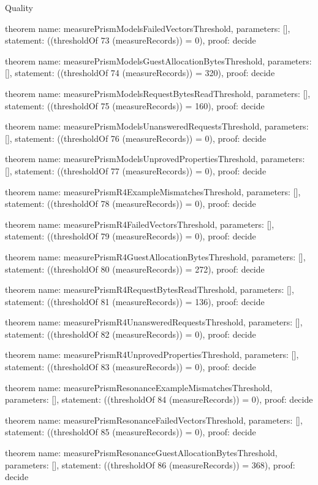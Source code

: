 \begin{lexlean}{Quality}
\begin{semanticmodule}
theorem{
  name: measurePrismModelsFailedVectorsThreshold,
  parameters: [],
  statement: ((thresholdOf 73 (measureRecords)) = 0),
  proof: decide{}
}

theorem{
  name: measurePrismModelsGuestAllocationBytesThreshold,
  parameters: [],
  statement: ((thresholdOf 74 (measureRecords)) = 320),
  proof: decide{}
}

theorem{
  name: measurePrismModelsRequestBytesReadThreshold,
  parameters: [],
  statement: ((thresholdOf 75 (measureRecords)) = 160),
  proof: decide{}
}

theorem{
  name: measurePrismModelsUnansweredRequestsThreshold,
  parameters: [],
  statement: ((thresholdOf 76 (measureRecords)) = 0),
  proof: decide{}
}

theorem{
  name: measurePrismModelsUnprovedPropertiesThreshold,
  parameters: [],
  statement: ((thresholdOf 77 (measureRecords)) = 0),
  proof: decide{}
}

theorem{
  name: measurePrismR4ExampleMismatchesThreshold,
  parameters: [],
  statement: ((thresholdOf 78 (measureRecords)) = 0),
  proof: decide{}
}

theorem{
  name: measurePrismR4FailedVectorsThreshold,
  parameters: [],
  statement: ((thresholdOf 79 (measureRecords)) = 0),
  proof: decide{}
}

theorem{
  name: measurePrismR4GuestAllocationBytesThreshold,
  parameters: [],
  statement: ((thresholdOf 80 (measureRecords)) = 272),
  proof: decide{}
}

theorem{
  name: measurePrismR4RequestBytesReadThreshold,
  parameters: [],
  statement: ((thresholdOf 81 (measureRecords)) = 136),
  proof: decide{}
}

theorem{
  name: measurePrismR4UnansweredRequestsThreshold,
  parameters: [],
  statement: ((thresholdOf 82 (measureRecords)) = 0),
  proof: decide{}
}

theorem{
  name: measurePrismR4UnprovedPropertiesThreshold,
  parameters: [],
  statement: ((thresholdOf 83 (measureRecords)) = 0),
  proof: decide{}
}

theorem{
  name: measurePrismResonanceExampleMismatchesThreshold,
  parameters: [],
  statement: ((thresholdOf 84 (measureRecords)) = 0),
  proof: decide{}
}

theorem{
  name: measurePrismResonanceFailedVectorsThreshold,
  parameters: [],
  statement: ((thresholdOf 85 (measureRecords)) = 0),
  proof: decide{}
}

theorem{
  name: measurePrismResonanceGuestAllocationBytesThreshold,
  parameters: [],
  statement: ((thresholdOf 86 (measureRecords)) = 368),
  proof: decide{}
}


\end{semanticmodule}
\end{lexlean}
